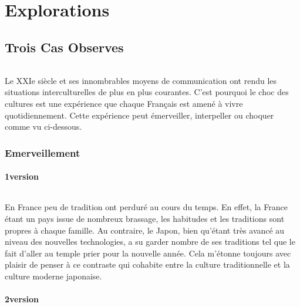 \part{Explorations}
\chapter{Trois Cas Observes}
\paragraph{}
Le XXIe siècle et ses innombrables moyens de communication ont rendu les
situations interculturelles de plus en plus courantes. C’est pourquoi le choc
des cultures est une expérience que chaque Français est amené à vivre
quotidiennement. Cette expérience peut émerveiller, interpeller ou choquer
comme vu ci-dessous.

\section{Emerveillement}

\subsection{1\ier version}
\paragraph{}
En France peu de tradition ont perduré au cours du temps. En effet, la France
étant un pays issue de nombreux brassage, les habitudes et les traditions sont
propres à chaque famille. Au contraire, le Japon, bien qu’étant très avancé au
niveau des nouvelles technologies, a su garder nombre de ses traditions tel que
le fait d’aller au temple prier pour la nouvelle année. Cela m’étonne toujours
avec plaisir de penser à ce contraste qui cohabite entre la culture
traditionnelle et la culture moderne japonaise.

\subsection{2\ieme version}

